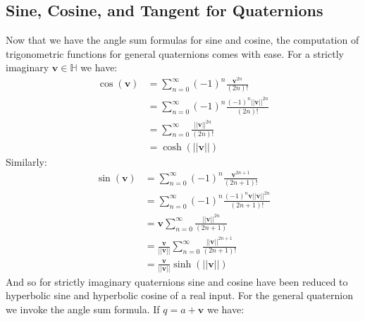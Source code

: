 \documentclass{article}
\begin{document}
        \subsection{Sine, Cosine, and Tangent for Quaternions}
            Now that we have the angle sum formulas for sine and cosine, the
            computation of trigonometric functions for general quaternions comes
            with ease. For a strictly imaginary $\mathbf{v}\in\mathbb{H}$
            we have:
            \begin{subequations}
                \begin{align}
                    \cos(\mathbf{v})
                    &=\sum_{n=0}^{\infty}(-1)^{n}\frac{\mathbf{v}^{2n}}{(2n)!}\\
                    &=\sum_{n=0}^{\infty}(-1)^{n}
                        \frac{(-1)^{n}||\mathbf{v}||^{2n}}{(2n)!}\\
                    &=\sum_{n=0}^{\infty}\frac{||\mathbf{v}||^{2n}}{(2n)!}\\
                    &=\cosh(||\mathbf{v}||)
                \end{align}
            \end{subequations}
            Similarly:
            \begin{subequations}
                \begin{align}
                    \sin(\mathbf{v})
                    &=\sum_{n=0}^{\infty}(-1)^{n}
                        \frac{\mathbf{v}^{2n+1}}{(2n+1)!}\\
                    &=\sum_{n=0}^{\infty}(-1)^{n}
                        \frac{(-1)^{n}\mathbf{v}||\mathbf{v}||^{2n}}{(2n+1)!}\\
                    &=\mathbf{v}\sum_{n=0}^{\infty}
                        \frac{||\mathbf{v}||^{2n}}{(2n+1)}\\
                    &=\frac{\mathbf{v}}{||\mathbf{v}||}
                        \sum_{n=0}^{\infty}
                        \frac{||\mathbf{v}||^{2n+1}}{(2n+1)!}\\
                    &=\frac{\mathbf{v}}{||\mathbf{v}||}\sinh(||\mathbf{v}||)
                \end{align}
            \end{subequations}
            And so for strictly imaginary quaternions sine and cosine have been
            reduced to hyperbolic sine and hyperbolic cosine of a real input.
            For the general quaternion we invoke the angle sum formula. If
            $q=a+\mathbf{v}$ we have:
\end{document}

